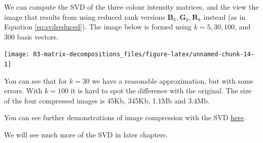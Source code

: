 \documentclass[]{book}
\newenvironment{Shaded}{\begin{snugshade}}{\end{snugshade}}
\newcommand{\CommentTok}[1]{\textcolor[rgb]{0.56,0.35,0.01}{\textit{#1}}}
\newcommand{\ControlFlowTok}[1]{\textcolor[rgb]{0.13,0.29,0.53}{\textbf{#1}}}
\newcommand{\DataTypeTok}[1]{\textcolor[rgb]{0.13,0.29,0.53}{#1}}
\newcommand{\DecValTok}[1]{\textcolor[rgb]{0.00,0.00,0.81}{#1}}
\newcommand{\KeywordTok}[1]{\textcolor[rgb]{0.13,0.29,0.53}{\textbf{#1}}}
\newcommand{\NormalTok}[1]{#1}
\newcommand{\OperatorTok}[1]{\textcolor[rgb]{0.81,0.36,0.00}{\textbf{#1}}}
\newcommand{\StringTok}[1]{\textcolor[rgb]{0.31,0.60,0.02}{#1}}
\theoremstyle{definition}
\theoremstyle{definition}
\theoremstyle{definition}
\theoremstyle{remark}
\begin{document}
We can compute the SVD of the three colour intensity matrices, and the view the image that results from using reduced rank versions \(\boldsymbol B_k, \boldsymbol G_k, \boldsymbol R_k\) instead (as in Equation \eqref{eq:svdreduced}). The image below is formed using \(k=5, 30, 100\), and \(300\) basis vectors.

\begin{Shaded}
\end{Shaded}

\texttt{[image: 03-matrix-decompositions\_files/figure-latex/unnamed-chunk-14-1]}

You can see that for \(k=30\) we have a reasonable approximation, but with some errors. With \(k=100\) it is hard to spot the difference with the original. The size of the four compressed images is 45Kb, 345Kb, 1.1Mb and 3.4Mb.

You can see further demonstrations of image compression with the SVD \href{http://timbaumann.info/svd-image-compression-demo/}{here}.

We will see much more of the SVD in later chapters.


\end{document}
